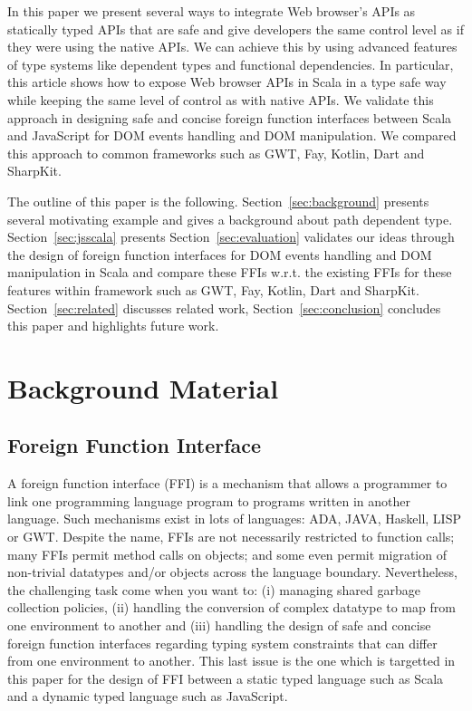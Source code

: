 \documentclass[runningheads,a4paper]{llncs}
\begin{document}
In this paper we present several ways to integrate Web browser’s APIs as statically typed APIs that are safe and
give developers the same control level as if they were using the native APIs. We can achieve this by using advanced
features of type systems like dependent types and functional dependencies. In particular, this article shows how to expose Web browser APIs in Scala in a
type safe way while keeping the same level of control as with native APIs. We validate this approach in designing safe and concise foreign function interfaces between Scala and
JavaScript for DOM events handling and DOM manipulation. We compared this approach to common frameworks such as GWT,
Fay, Kotlin, Dart and SharpKit.


The outline of this paper is the following.
Section~\ref{sec:background} presents several motivating example and gives a background about path dependent type.
Section~\ref{sec:jsscala} presents %
Section~\ref{sec:evaluation} validates our ideas through the design of foreign function interfaces for  DOM events handling and DOM manipulation in Scala and compare these FFIs w.r.t. the existing FFIs for these features within framework such as GWT,
Fay, Kotlin, Dart and SharpKit.
Section~\ref{sec:related} discusses related work, Section~\ref{sec:conclusion} concludes this paper and highlights  future work. 


\section{Background Material}

\subsection{Foreign Function Interface}

A foreign function interface (FFI) is a mechanism that allows a programmer to link one programming language program to programs written in another language.
Such mechanisms exist in lots of languages: ADA, JAVA, Haskell, LISP or GWT.  Despite the name, FFIs are not necessarily restricted to function calls; many FFIs permit method calls on objects; and some even permit migration of non-trivial datatypes and/or objects across the language boundary. Nevertheless, the challenging task come when you want to:
(i) managing shared garbage collection policies, (ii) handling the conversion of complex datatype to map from one environment to another and (iii) handling the design of safe and concise foreign function interfaces regarding typing system constraints that can differ from one environment to another. This last issue is the one which is targetted in this paper for the design of FFI between a static typed language such as Scala and a dynamic typed language such as JavaScript. 
\end{document}
